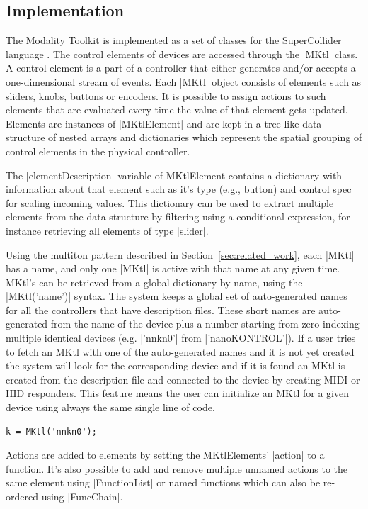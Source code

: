 \documentclass{article}
\begin{document}
\subsection{Implementation}
\label{sub:implementation}

The Modality Toolkit is implemented as a set of classes for the SuperCollider language \cite{mccartney2002-ret}. 
The control elements of devices are accessed through the |MKtl| class. 
A control element is a part of a controller that either generates and/or accepts a one-dimensional stream of events. 
Each |MKtl| object consists of elements such as sliders, knobs, buttons or encoders.
It is possible to assign actions to such elements that are evaluated every time the value of that element gets updated.
Elements are instances of |MKtlElement| and are kept in a tree-like data structure of nested arrays and dictionaries which represent the spatial grouping of control elements in the physical controller. 

The |elementDescription| variable of MKtlElement contains a dictionary with information about that element such as it's type (e.g., button) and control spec for scaling incoming values. 
This dictionary can be used to extract multiple elements from the data structure by filtering using a conditional expression, for instance retrieving all elements of type |slider|.

Using the multiton pattern described in Section~\ref{sec:related_work}, each |MKtl| has a name, and only one |MKtl| is active with that name at any given time. 
MKtl's can be retrieved from a global dictionary by name, using the |MKtl('name')| syntax. 
The system keeps a global set of auto-generated names for all the controllers that have description files. These short names are auto-generated from the name of the device plus a number starting from zero indexing multiple identical devices (e.g. |'nnkn0'| from |'nanoKONTROL'|). If a user tries to fetch an MKtl with one of the auto-generated names and it is not yet created the system will look for the corresponding device and if it is found an MKtl is created from the description file and connected to the device by creating MIDI or HID responders. This feature means the user can initialize an MKtl for a given device using always the same single line of code.

\begin{Verbatim}
k = MKtl('nnkn0');
\end{Verbatim}

Actions are added to elements by setting the MKtlElements' |action| to a function.  It's also possible to add and remove multiple unnamed actions to the same element using |FunctionList| or named functions which can also be re-ordered using |FuncChain|.
\end{document}
